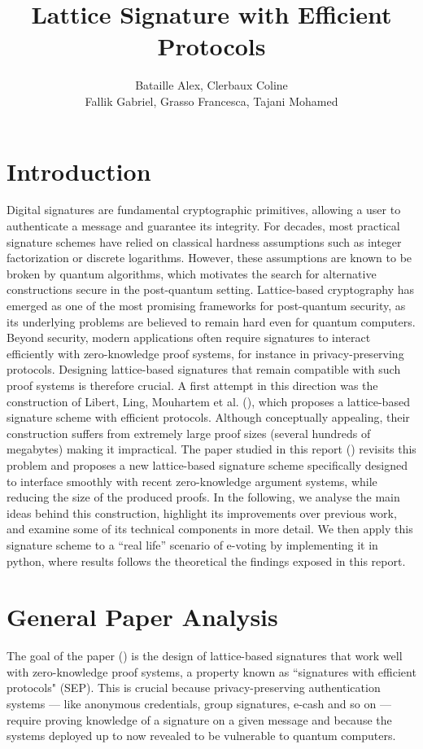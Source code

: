 \documentclass[a4paper]{article}
\title{Lattice Signature with Efficient Protocols}
\author{Bataille Alex, Clerbaux Coline\\Fallik Gabriel, Grasso Francesca, Tajani Mohamed}
\begin{document}
\maketitle
\section{Introduction}
Digital signatures are fundamental cryptographic primitives, allowing a user to authenticate a message and guarantee its integrity. For decades,
most practical signature schemes have relied on classical hardness assumptions such as integer factorization or discrete logarithms. However,
these assumptions are known to be broken by quantum algorithms, which motivates the search for alternative constructions secure in the post-quantum setting.
Lattice-based cryptography has emerged as one of the most promising frameworks for post-quantum security, as its underlying problems are believed to remain
hard even for quantum computers. Beyond security, modern applications often require signatures to interact efficiently with zero-knowledge proof systems,
for instance in privacy-preserving protocols. Designing lattice-based signatures that remain compatible with such proof systems is therefore crucial.
A first attempt in this direction was the construction of Libert, Ling, Mouhartem et al. (\cite{LLM+16}), which proposes a lattice-based signature scheme with
efficient protocols. Although conceptually appealing, their construction suffers from extremely large proof sizes (several hundreds of megabytes) making it impractical.
The paper studied in this report (\cite{mainPaper}) revisits this problem and proposes a new lattice-based signature scheme specifically designed to interface smoothly
with recent zero-knowledge argument systems, while reducing the size of the produced proofs. In the following, we analyse the main ideas behind
this construction, highlight its improvements over previous work, and examine some of its technical components in more detail. We then apply 
this signature scheme to a ``real life'' scenario of e-voting by implementing it in python, where results follows the theoretical the findings exposed in this report.  

\section{General Paper Analysis}

The goal of the paper (\cite{mainPaper}) is the design of lattice-based signatures that work well with zero-knowledge proof systems, a property known as ``signatures with efficient protocols" (SEP). This is crucial because privacy-preserving authentication systems — like anonymous credentials, group signatures, e-cash and so on — require proving knowledge of a signature on a given message and because the systems deployed up to now revealed to be vulnerable to quantum computers.
\end{document}
